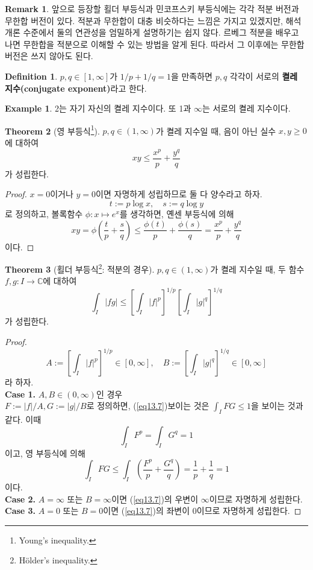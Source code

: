 \documentclass[11pt]{book}
\numberwithin{equation}{chapter}
\def\CC{\mathbb{C}}
\newcommand{\abs}[1]{\left\vert#1\right\vert}
\newcommand{\paren}[1]{\left(#1\right)}
\newcommand{\sqbracket}[1]{\left[#1\right]}
\theoremstyle{definition}
\newtheorem{thm}{Theorem}[section]
\newtheorem{defn}[thm]{Definition}
\newtheorem*{rem}{Remark}
\newtheorem*{ex}{Example}
\begin{document}
\begin{rem}
    앞으로 등장할 횔더 부등식과 민코프스키 부등식에는 각각 적분 버전과 무한합 버전이 있다. 적분과 무한합이 대충 비슷하다는 느낌은 가지고 있겠지만, 해석개론 수준에서 둘의 연관성을 엄밀하게 설명하기는 쉽지 않다. 르베그 적분을 배우고 나면 무한합을 적분으로 이해할 수 있는 방법을 알게 된다. 따라서 그 이후에는 무한합 버전은 쓰지 않아도 된다.
\end{rem}

\begin{defn}
    \(p, q \in [1, \infty]\)가 \(1/p + 1/q = 1\)을 만족하면 \(p, q\) 각각이 서로의 \textbf{켤레 지수(conjugate exponent)}라고 한다.
\end{defn}
\begin{ex}
    2는 자기 자신의 켤레 지수이다. 또 1과 \(\infty\)는 서로의 켤레 지수이다.
\end{ex}

\begin{thm}[영 부등식\footnote{Young's inequality.}]
    \(p, q \in (1, \infty)\)가 켤레 지수일 때, 음이 아닌 실수 \(x, y \ge 0\)에 대하여
    \[
    xy \le \frac{x^p}{p} + \frac{y^q}{q}    
    \]
    가 성립한다.
\end{thm}
\begin{proof}
    \(x = 0\)이거나 \(y = 0\)이면 자명하게 성립하므로 둘 다 양수라고 하자.
    \[
    t := p \log x, \quad s:= q \log y
    \]
    로 정의하고, 볼록함수 \(\phi : x \mapsto e^x\)를 생각하면, 옌센 부등식에 의해
    \[
    xy = \phi \paren{\frac{t}{p} + \frac{s}{q}} \le \frac{\phi(t)}{p} + \frac{\phi(s)}{q} = \frac{x^p}{p} + \frac{y^q}{q}   
    \]
    이다.
\end{proof}

\begin{thm}[횔더 부등식\footnote{H\"older's inequality.}: 적분의 경우]
    \(p, q \in (1, \infty)\)가 켤레 지수일 때, 두 함수 \(f, g : I \to \CC\)에 대하여
    \begin{equation} \label{eq13.7}
        \int_I \abs{fg} \le \sqbracket{\int_I \abs{f}^p}^{1/p}\sqbracket{\int_I \abs{g}^q}^{1/q}
    \end{equation}
    가 성립한다.
\end{thm}
\begin{proof}
    \[
    A := \sqbracket{\int_I \abs{f}^p}^{1/p} \in [0, \infty], \quad B := \sqbracket{\int_I \abs{g}^q}^{1/q} \in [0, \infty]
    \]
    라 하자.\\
    \textbf{Case 1.} \(A, B \in (0, \infty)\)인 경우\\
    \(F := \abs{f} / A, G := \abs{g} / B\)로 정의하면, (\ref{eq13.7})\을 보이는 것은 \(\int_I FG \le 1\)을 보이는 것과 같다. 이때
    \[
    \int_I F^p = \int_I G^q = 1  
    \]
    이고, 영 부등식에 의해
    \[
        \int_I FG \le \int_I \paren{\frac{F^p}{p} + \frac{G^q}{q}} = \frac{1}{p} + \frac{1}{q} = 1
    \]
    이다.\\
    \textbf{Case 2.} \(A = \infty\) 또는 \(B = \infty\)이면 (\ref{eq13.7})의 우변이 \(\infty\)이므로 자명하게 성립한다.\\
    \textbf{Case 3.} \(A = 0\) 또는 \(B = 0\)이면 (\ref{eq13.7})의 좌변이 0이므로 자명하게 성립한다.
\end{proof}
\end{document}
